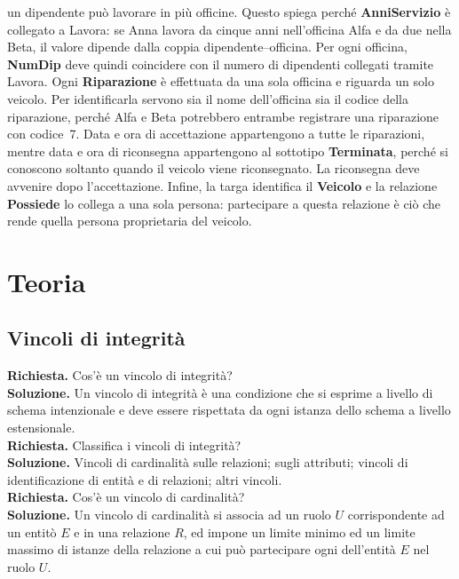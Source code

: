 un dipendente può lavorare in più officine. Questo spiega perché \textbf{AnniServizio} è collegato a Lavora: se Anna lavora da cinque anni nell'officina Alfa 
e da due nella Beta, il valore dipende dalla coppia dipendente--officina. Per ogni officina, \textbf{NumDip} deve quindi coincidere con il numero di dipendenti 
collegati tramite Lavora. Ogni \textbf{Riparazione} è effettuata da una sola officina e riguarda un solo veicolo. Per identificarla servono sia il nome dell'officina 
sia il codice della riparazione, perché Alfa e Beta potrebbero entrambe registrare una riparazione con codice~7. Data e ora di accettazione appartengono a tutte le riparazioni, 
mentre data e ora di riconsegna appartengono al sottotipo \textbf{Terminata}, perché si conoscono soltanto quando il veicolo viene riconsegnato. La riconsegna deve avvenire dopo l'accettazione. 
Infine, la targa identifica il \textbf{Veicolo} e la relazione \textbf{Possiede} lo collega a una sola persona: partecipare a questa relazione è ciò che rende quella persona proprietaria del veicolo.
\section{Teoria}
\subsection{Vincoli di integrità}
\textbf{Richiesta. }Cos'è un vincolo di integrità?\\
\textbf{Soluzione. }Un vincolo di integrità è una condizione che si esprime a livello di schema intenzionale e deve essere rispettata da ogni istanza dello schema a livello estensionale.\medskip\\
\textbf{Richiesta. }Classifica i vincoli di integrità?\\
\textbf{Soluzione. }Vincoli di cardinalità sulle relazioni; sugli attributi; vincoli di identificazione di entità e di relazioni; altri vincoli.\medskip\\
\textbf{Richiesta. }Cos'è un vincolo di cardinalità?\\
\textbf{Soluzione. }Un vincolo di cardinalità si associa ad un ruolo $U$ corrispondente ad un entitò $E$ e in una relazione $R$, ed impone un limite minimo ed un limite massimo di istanze della relazione a cui può partecipare ogni dell'entità $E$ nel ruolo $U$.
